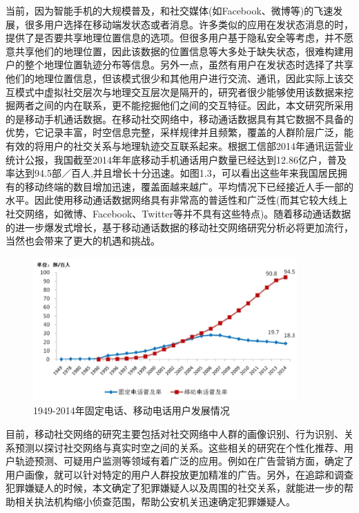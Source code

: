 当前，因为智能手机的大规模普及，和社交媒体(如Facebook、微博等)的飞速发展，很多用户选择在移动端发状态或者消息。许多类似的应用在发状态消息的时，提供了是否要共享地理位置信息的选项。但很多用户基于隐私安全等考虑，并不愿意共享他们的地理位置，因此该数据的位置信息等大多处于缺失状态，很难构建用户的整个地理位置轨迹分布等信息。另外一点，虽然有用户在发状态时选择了共享他们的地理位置信息，但该模式很少和其他用户进行交流、通讯，因此实际上该交互模式中虚拟社交层次与地理交互层次是隔开的，研究者很少能够使用该数据来挖掘两者之间的内在联系，更不能挖掘他们之间的交互特征。因此，本文研究所采用的是移动手机通话数据。在移动社交网络中，移动通话数据具有其它数据不具备的优势，它记录丰富，时空信息完整，采样规律并且频繁，覆盖的人群阶层广泛，能有效的将用户的社交关系与地理轨迹交互联系起来。根据工信部2014年通讯运营业统计公报，我国截至2014年年底移动手机通话用户数量已经达到12.86亿户，普及率达到94.5部／百人,并且增长十分迅速。如图1.3，可以看出这些年来我国居民拥有的移动终端的数目增加迅速，覆盖面越来越广。平均情况下已经接近人手一部的水平。因此使用移动通话数据网络具有非常高的普适性和广泛性(而其它较大线上社交网络，如微博、Facebook、Twitter等并不具有这些特点)。随着移动通话数据的进一步爆发式增长，基于移动通话数据的移动社交网络研究分析必将更加流行，当然也会带来了更大的机遇和挑战。


\begin{figure}[!ht]
	\centering
	\includegraphics[scale=1,width=0.9\textwidth]{figure/mobileinc.png}
	\caption{1949-2014年固定电话、移动电话用户发展情况}
	\label{fig-mobileinc}
\end{figure}


目前，移动社交网络的研究主要包括对社交网络中人群的画像识别、行为识别、关系预测以探讨社交网络与真实时空之间的关系。这些相关的研究在个性化推荐、用户轨迹预测、可疑用户监测等领域有着广泛的应用。例如在广告营销方面，确定了用户画像，就可以针对特定的用户人群投放更加精准的广告。另外，在追踪和调查犯罪嫌疑人的时候，本文确定了犯罪嫌疑人以及周围的社交关系，就能进一步的帮助相关执法机构缩小侦查范围，帮助公安机关迅速确定犯罪嫌疑人。

